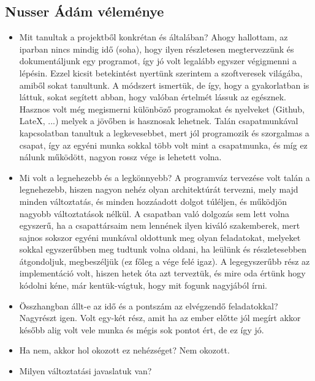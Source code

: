 \subsection{Nusser Ádám véleménye}
\begin{itemize}
\item Mit tanultak a projektből konkrétan és általában?\newline
	Ahogy hallottam, az iparban nincs mindig idő (soha), hogy ilyen részletesen megtervezzünk és dokumentáljunk egy programot, így jó volt legalább egyszer végigmenni a lépésin. Ezzel kicsit betekintést nyertünk szerintem a szoftveresek világába, amiből sokat tanultunk. A módszert ismertük, de így, hogy a gyakorlatban is láttuk, sokat segített abban, hogy valóban értelmét lássuk az egésznek. Hasznos volt még megismerni különböző programokat és nyelveket (Github, LateX, ...) melyek a jövőben is hasznosak lehetnek.
\newline Talán csapatmunkával kapcsolatban tanultuk a legkevesebbet, mert jól programozik és szorgalmas a csapat, így az egyéni munka sokkal több volt mint a csapatmunka, és míg ez nálunk működött, nagyon rossz vége is lehetett volna.
\item Mi volt a legnehezebb és a legkönnyebb? \newline
	A programváz tervezése volt talán a legnehezebb, hiszen nagyon nehéz olyan architektúrát tervezni, mely majd minden változtatás, és minden hozzáadott dolgot túléljen, és működjön nagyobb változtatások nélkül. A csapatban való dolgozás sem lett volna egyszerű, ha a csapattársaim nem lennének ilyen kiváló szakemberek, mert sajnos sokszor egyéni munkával oldottunk meg olyan feladatokat, melyeket sokkal egyszerűbben meg tudtunk volna oldani, ha leülünk és részletesebben átgondoljuk, megbeszéljük (ez főleg a vége felé igaz).
\newline A legegyszerűbb rész az implementáció volt, hiszen hetek óta azt terveztük, és mire oda értünk hogy kódolni kéne, már kentük-vágtuk, hogy mit fogunk nagyjából írni.
\item Összhangban állt-e az idő és a pontszám az elvégzendő feladatokkal? \newline
	Nagyrészt igen. Volt egy-két rész, amit ha az ember előtte jól megírt akkor később alig volt vele munka és mégis sok pontot ért, de ez így jó.
\item Ha nem, akkor hol okozott ez nehézséget? \newline
	Nem okozott.
\item Milyen változtatási javaslatuk van? \newline

\end{itemize}
